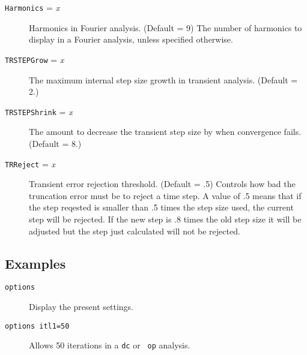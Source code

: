 \begin{description}
\item[{\tt Harmonics} = {\it x}] Harmonics in Fourier analysis.
(Default = 9) The number of harmonics to display in a Fourier
analysis, unless specified otherwise.

\item[{\tt TRSTEPGrow} = {\it x}] The maximum internal step size
growth in transient analysis.  (Default = 2.)

\item[{\tt TRSTEPShrink} = {\it x}] The amount to decrease the
transient step size by when convergence fails.  (Default = 8.)

\item[{\tt TRReject} = {\it x}] Transient error rejection threshold.
(Default = .5)  Controls how bad the truncation error must be to
reject a time step.  A value of .5 means that if the step reqested
is smaller than .5 times the step size used, the current step will
be rejected.  If the new step is .8 times the old step size it will
be adjusted but the step just calculated will not be rejected.

\end{description}
\subsection{Examples}

\begin{description}

\item[{\tt options}] Display the present settings.

\item[{\tt options  itl1=50}] Allows 50 iterations in a {\tt dc} or {\tt
op} analysis.

\end{description}
